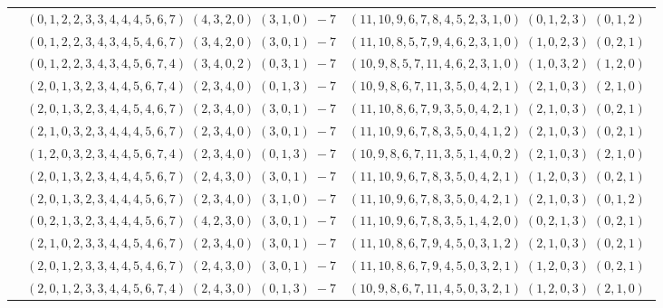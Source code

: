 \documentclass[11pt]{article}
\begin{document}
\begin{longtable}[l]{|c|c|c|}
 \cline{2-3} 
 & $(0 ,1 ,2 ,2 ,3 ,3 ,4 ,4 ,4 ,5 ,6 ,7) \;(4 ,3 ,2 ,0) \;(3 ,1 ,0) \;-7$ & $(11 ,10 ,9 ,6 ,7 ,8 ,4 ,5 ,2 ,3 ,1 ,0) \;(0 ,1 ,2 ,3) \;(0 ,1 ,2) \;$\\ 
 \cline{2-3} 
 & $(0 ,1 ,2 ,2 ,3 ,4 ,3 ,4 ,5 ,4 ,6 ,7) \;(3 ,4 ,2 ,0) \;(3 ,0 ,1) \;-7$ & $(11 ,10 ,8 ,5 ,7 ,9 ,4 ,6 ,2 ,3 ,1 ,0) \;(1 ,0 ,2 ,3) \;(0 ,2 ,1) \;$\\ 
 \cline{2-3} 
 & $(0 ,1 ,2 ,2 ,3 ,4 ,3 ,4 ,5 ,6 ,7 ,4) \;(3 ,4 ,0 ,2) \;(0 ,3 ,1) \;-7$ & $(10 ,9 ,8 ,5 ,7 ,11 ,4 ,6 ,2 ,3 ,1 ,0) \;(1 ,0 ,3 ,2) \;(1 ,2 ,0) \;$\\ 
 \cline{2-3} 
 & $(2 ,0 ,1 ,3 ,2 ,3 ,4 ,4 ,5 ,6 ,7 ,4) \;(2 ,3 ,4 ,0) \;(0 ,1 ,3) \;-7$ & $(10 ,9 ,8 ,6 ,7 ,11 ,3 ,5 ,0 ,4 ,2 ,1) \;(2 ,1 ,0 ,3) \;(2 ,1 ,0) \;$\\ 
 \cline{2-3} 
 & $(2 ,0 ,1 ,3 ,2 ,3 ,4 ,4 ,5 ,4 ,6 ,7) \;(2 ,3 ,4 ,0) \;(3 ,0 ,1) \;-7$ & $(11 ,10 ,8 ,6 ,7 ,9 ,3 ,5 ,0 ,4 ,2 ,1) \;(2 ,1 ,0 ,3) \;(0 ,2 ,1) \;$\\ 
 \cline{2-3} 
 & $(2 ,1 ,0 ,3 ,2 ,3 ,4 ,4 ,4 ,5 ,6 ,7) \;(2 ,3 ,4 ,0) \;(3 ,0 ,1) \;-7$ & $(11 ,10 ,9 ,6 ,7 ,8 ,3 ,5 ,0 ,4 ,1 ,2) \;(2 ,1 ,0 ,3) \;(0 ,2 ,1) \;$\\ 
 \cline{2-3} 
 & $(1 ,2 ,0 ,3 ,2 ,3 ,4 ,4 ,5 ,6 ,7 ,4) \;(2 ,3 ,4 ,0) \;(0 ,1 ,3) \;-7$ & $(10 ,9 ,8 ,6 ,7 ,11 ,3 ,5 ,1 ,4 ,0 ,2) \;(2 ,1 ,0 ,3) \;(2 ,1 ,0) \;$\\ 
 \cline{2-3} 
 & $(2 ,0 ,1 ,3 ,2 ,3 ,4 ,4 ,4 ,5 ,6 ,7) \;(2 ,4 ,3 ,0) \;(3 ,0 ,1) \;-7$ & $(11 ,10 ,9 ,6 ,7 ,8 ,3 ,5 ,0 ,4 ,2 ,1) \;(1 ,2 ,0 ,3) \;(0 ,2 ,1) \;$\\ 
 \cline{2-3} 
 & $(2 ,0 ,1 ,3 ,2 ,3 ,4 ,4 ,4 ,5 ,6 ,7) \;(2 ,3 ,4 ,0) \;(3 ,1 ,0) \;-7$ & $(11 ,10 ,9 ,6 ,7 ,8 ,3 ,5 ,0 ,4 ,2 ,1) \;(2 ,1 ,0 ,3) \;(0 ,1 ,2) \;$\\ 
 \cline{2-3} 
 & $(0 ,2 ,1 ,3 ,2 ,3 ,4 ,4 ,4 ,5 ,6 ,7) \;(4 ,2 ,3 ,0) \;(3 ,0 ,1) \;-7$ & $(11 ,10 ,9 ,6 ,7 ,8 ,3 ,5 ,1 ,4 ,2 ,0) \;(0 ,2 ,1 ,3) \;(0 ,2 ,1) \;$\\ 
 \cline{2-3} 
 & $(2 ,1 ,0 ,2 ,3 ,3 ,4 ,4 ,5 ,4 ,6 ,7) \;(2 ,3 ,4 ,0) \;(3 ,0 ,1) \;-7$ & $(11 ,10 ,8 ,6 ,7 ,9 ,4 ,5 ,0 ,3 ,1 ,2) \;(2 ,1 ,0 ,3) \;(0 ,2 ,1) \;$\\ 
 \cline{2-3} 
 & $(2 ,0 ,1 ,2 ,3 ,3 ,4 ,4 ,5 ,4 ,6 ,7) \;(2 ,4 ,3 ,0) \;(3 ,0 ,1) \;-7$ & $(11 ,10 ,8 ,6 ,7 ,9 ,4 ,5 ,0 ,3 ,2 ,1) \;(1 ,2 ,0 ,3) \;(0 ,2 ,1) \;$\\ 
 \cline{2-3} 
 & $(2 ,0 ,1 ,2 ,3 ,3 ,4 ,4 ,5 ,6 ,7 ,4) \;(2 ,4 ,3 ,0) \;(0 ,1 ,3) \;-7$ & $(10 ,9 ,8 ,6 ,7 ,11 ,4 ,5 ,0 ,3 ,2 ,1) \;(1 ,2 ,0 ,3) \;(2 ,1 ,0) \;$\\ 

\end{longtable}
\end{document}
